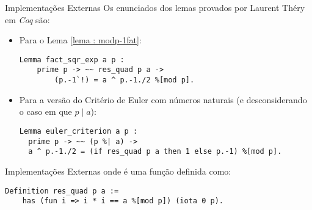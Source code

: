 \begin{frame}[fragile]{Implementações Externas}
    Os enunciados dos lemas provados por Laurent Théry em \textit{Coq} são:
    \begin{itemize}
        \item Para o Lema \ref{lema : modp-1fat}:
            \begin{lstlisting}[language=coq,frame=single,tabsize=1]
Lemma fact_sqr_exp a p :
    prime p -> ~~ res_quad p a -> 
        (p.-1`!) = a ^ p.-1./2 %[mod p].              
            \end{lstlisting}
        \item Para a versão do Critério de Euler com números naturais (e desconsiderando o caso em que $p \mid a$):
            \begin{lstlisting}[language=coq,frame=single,tabsize=1]
Lemma euler_criterion a p : 
  prime p -> ~~ (p %| a) -> 
  a ^ p.-1./2 = (if res_quad p a then 1 else p.-1) %[mod p].
            \end{lstlisting}
    \end{itemize}
\end{frame}

\begin{frame}[fragile]{Implementações Externas}
onde  é uma função definida como:
    \begin{lstlisting}[language=coq,frame=single,tabsize=1]
Definition res_quad p a := 
    has (fun i => i * i == a %[mod p]) (iota 0 p).
    \end{lstlisting}
\end{frame}


